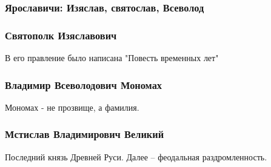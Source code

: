 \subsubsection*{Ярославичи: Изяслав, святослав, Всеволод}

\subsubsection*{Святополк Изяславович}

В его правление было написана "Повесть временных лет"

\subsubsection*{Владимир Всеволодович Мономах}

Мономах - не прозвище, а фамилия.

\subsubsection*{Мстислав Владимирович Великий}

Последний князь Древней Руси. Далее -- феодальная раздромленность.

